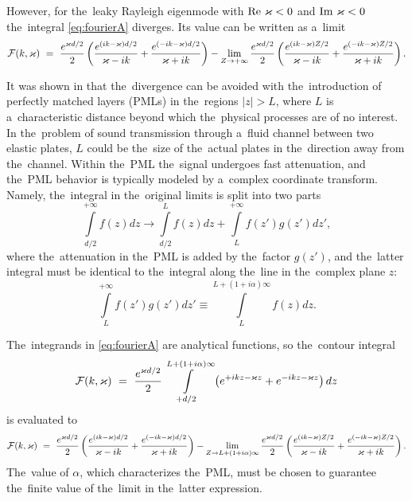 However, for the~leaky Rayleigh eigenmode with $\textrm{Re }\varkappa < 0$ and $\textrm{Im }\varkappa < 0$ the~integral \cref{eq:fourierA} diverges.
Its value can be written as a~limit
\begin{equation}
{\mathcal F}(k, \varkappa)~=~\frac{e^{\varkappa d/2}}{2}\left(\frac{e^{(ik-\varkappa)d/2}}{\varkappa-ik}+\frac{e^{(-ik-\varkappa)d/2}}{\varkappa+ik}\right) - \lim\limits_{Z\rightarrow +\infty}\frac{e^{\varkappa d/2}}{2}\left(\frac{e^{(ik-\varkappa)Z/2}}{\varkappa-ik}+\frac{e^{(-ik-\varkappa)Z/2}}{\varkappa+ik}\right).
\end{equation}

It was shown in \cite{jia} that the~divergence can be avoided with the~introduction of perfectly matched layers (PMLs) in the~regions $|z| > L$, where $L$ is a~characteristic distance beyond which the~physical processes are of no interest.
In the~problem of sound transmission through a~fluid channel between two elastic plates, $L$ could be the~size of the~actual plates in the~direction away from the~channel.
Within the~PML the~signal undergoes fast attenuation, and the~PML behavior is typically modeled by a~complex coordinate transform.
Namely, the~integral in the~original limits is split into two parts
\begin{equation}
\int\limits_{d/2}^{+\infty}f(z)dz \rightarrow \int\limits_{d/2}^{L}f(z)dz + \int\limits_{L}^{+\infty}f(z')g(z')dz',
\end{equation}
where the~attenuation in the~PML is added by the~factor $g(z')$, and the~latter integral must be identical to the~integral along the~line in the~complex plane $z$:
\begin{equation}
\int\limits_{L}^{+\infty}f(z')g(z')dz' \equiv \int\limits_{L}^{L+(1+i\alpha)\infty}f(z)dz.
\end{equation}

The~integrands in \cref{eq:fourierA} are analytical functions, so the~contour integral
\begin{equation}
{\mathcal F}(k, \varkappa)~=~\frac{e^{\varkappa d/2}}{2}\int\limits_{+d/2}^{L+(1+i\alpha)\infty}\left(e^{+ikz-\varkappa z}+e^{-ikz-\varkappa z}\right)dz
\end{equation}
is evaluated to
\begin{equation}
\label{eq:limitA}
{\mathcal F}(k, \varkappa)~=~\frac{e^{\varkappa d/2}}{2}\left(\frac{e^{(ik-\varkappa)d/2}}{\varkappa-ik}+\frac{e^{(-ik-\varkappa)d/2}}{\varkappa+ik}\right) - \lim\limits_{Z\rightarrow L+(1+i\alpha)\infty}\frac{e^{\varkappa d/2}}{2}\left(\frac{e^{(ik-\varkappa)Z/2}}{\varkappa-ik}+\frac{e^{(-ik-\varkappa)Z/2}}{\varkappa+ik}\right).
\end{equation}
The~value of $\alpha$, which characterizes the~PML, must be chosen to guarantee the~finite value of the~limit in the~latter expression.

